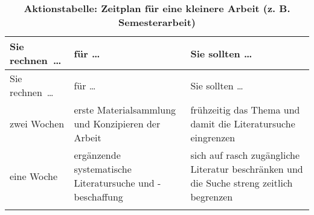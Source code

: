 \documentclass[]{article}
\begin{document}
\begin{longtable}[]{@{}lll@{}}
\caption{\textbf{Aktionstabelle: Zeitplan für eine kleinere Arbeit (z.
B. Semesterarbeit)}}\tabularnewline
\toprule
\begin{minipage}[b]{0.14\columnwidth}\raggedright\strut
Sie rechnen~\ldots{}\strut
\end{minipage} & \begin{minipage}[b]{0.40\columnwidth}\raggedright\strut
für \ldots{}\strut
\end{minipage} & \begin{minipage}[b]{0.37\columnwidth}\raggedright\strut
Sie sollten \ldots{}\strut
\end{minipage}\tabularnewline
\midrule
\endfirsthead
\toprule
\begin{minipage}[b]{0.14\columnwidth}\raggedright\strut
Sie rechnen~\ldots{}\strut
\end{minipage} & \begin{minipage}[b]{0.40\columnwidth}\raggedright\strut
für \ldots{}\strut
\end{minipage} & \begin{minipage}[b]{0.37\columnwidth}\raggedright\strut
Sie sollten \ldots{}\strut
\end{minipage}\tabularnewline
\midrule
\endhead
\begin{minipage}[t]{0.14\columnwidth}\raggedright\strut
zwei Wochen\strut
\end{minipage} & \begin{minipage}[t]{0.40\columnwidth}\raggedright\strut
erste Materialsammlung und Konzipieren der Arbeit\strut
\end{minipage} & \begin{minipage}[t]{0.37\columnwidth}\raggedright\strut
frühzeitig das Thema und damit die Literatursuche eingrenzen\strut
\end{minipage}\tabularnewline
\begin{minipage}[t]{0.14\columnwidth}\raggedright\strut
eine Woche\strut
\end{minipage} & \begin{minipage}[t]{0.40\columnwidth}\raggedright\strut
ergänzende systematische Literatursuche und -beschaffung\strut
\end{minipage} & \begin{minipage}[t]{0.37\columnwidth}\raggedright\strut
sich auf rasch zugängliche Literatur beschränken und die Suche streng
zeitlich begrenzen\strut
\end{minipage}\tabularnewline
\begin{minipage}[t]{0.14\columnwidth}\raggedright\strut

\end{minipage}
\end{longtable}
\end{document}
